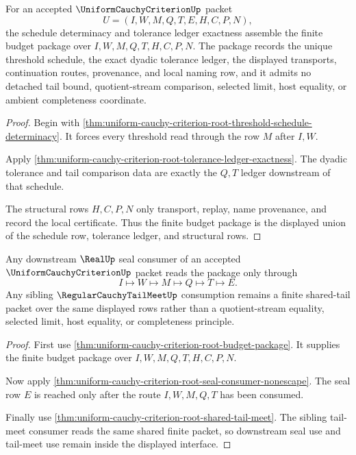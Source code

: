 \begin{theorem}
\label{thm:uniform-cauchy-criterion-root-budget-package}
For an accepted $\UniformCauchyCriterionUp$ packet
$$
U=(I,W,M,Q,T,E,H,C,P,N),
$$
the schedule determinacy and tolerance ledger exactness assemble the finite budget package over $I,W,M,Q,T,H,C,P,N$. The package records the unique threshold schedule, the exact dyadic tolerance ledger, the displayed transports, continuation routes, provenance, and local naming row, and it admits no detached tail bound, quotient-stream comparison, selected limit, host equality, or ambient completeness coordinate.
\end{theorem}
\begin{proof}
Begin with \autoref{thm:uniform-cauchy-criterion-root-threshold-schedule-determinacy}. It forces every threshold read through the row $M$ after $I,W$.

Apply \autoref{thm:uniform-cauchy-criterion-root-tolerance-ledger-exactness}. The dyadic tolerance and tail comparison data are exactly the $Q,T$ ledger downstream of that schedule.

The structural rows $H,C,P,N$ only transport, replay, name provenance, and record the local certificate. Thus the finite budget package is the displayed union of the schedule row, tolerance ledger, and structural rows.
\end{proof}

\begin{theorem}
\label{thm:uniform-cauchy-criterion-root-downstream-seal-interface}
Any downstream $\RealUp$ seal consumer of an accepted $\UniformCauchyCriterionUp$ packet reads the package only through
$$
I \longmapsto W \longmapsto M \longmapsto Q \longmapsto T \longmapsto E.
$$
Any sibling $\RegularCauchyTailMeetUp$ consumption remains a finite shared-tail packet over the same displayed rows rather than a quotient-stream equality, selected limit, host equality, or completeness principle.
\end{theorem}
\begin{proof}
First use \autoref{thm:uniform-cauchy-criterion-root-budget-package}. It supplies the finite budget package over $I,W,M,Q,T,H,C,P,N$.

Now apply \autoref{thm:uniform-cauchy-criterion-root-seal-consumer-nonescape}. The seal row $E$ is reached only after the route $I,W,M,Q,T$ has been consumed.

Finally use \autoref{thm:uniform-cauchy-criterion-root-shared-tail-meet}. The sibling tail-meet consumer reads the same shared finite packet, so downstream seal use and tail-meet use remain inside the displayed interface.
\end{proof}

